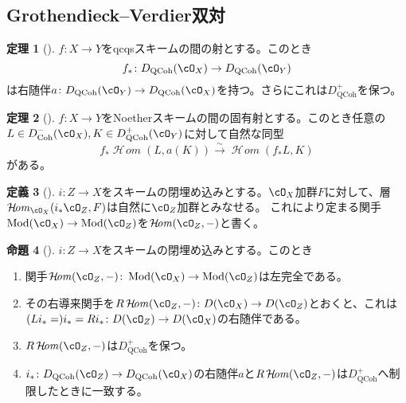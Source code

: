 \documentclass[uplatex, a4paper, dvipdfmx]{jsarticle}
\theoremstyle{definition}
\newtheorem{theorem}{定理}[section]
\newtheorem{definition}[theorem]{定義}
\newtheorem{proposition}[theorem]{命題}
\DeclareMathOperator{\CHom}{\mathcal{H}\!\mathit{om}}
\DeclareMathOperator{\Coh}{\mathrm{Coh}}
\DeclareMathOperator{\QCoh}{\mathrm{QCoh}}
\DeclareMathOperator{\Mod}{\mathrm{Mod}}
\begin{document}
\subsection{Grothendieck--Verdier双対}
\begin{theorem}[{\cite[\href{https://stacks.math.columbia.edu/tag/0A9E}{Tag 0A9E}]{stacks-project}}]
    $f \colon X \to Y$をqcqsスキームの間の射とする。このとき
    \begin{equation}
        f_* \colon D_{\QCoh}(\cO_X) \to D_{\QCoh}(\cO_Y)
    \end{equation}
    は右随伴$a \colon D_{\QCoh}(\cO_Y) \to D_{\QCoh}(\cO_X)$を持つ。さらにこれは$D_{\QCoh}^+$を保つ。
\end{theorem}
\begin{theorem}[{\cite[\href{https://stacks.math.columbia.edu/tag/0GEW}{Tag 0GEW}]{stacks-project}}]\label{thm:Grothendieck-Verdier-duality-for-complexes}
    $f \colon X \to Y$をNoetherスキームの間の固有射とする。このとき任意の$L \in D_{\Coh}^-(\cO_X), K \in D_{\QCoh}^+(\cO_Y)$に対して自然な同型
    \begin{equation}
        f_* \CHom(L, a(K)) \xrightarrow{\sim} \CHom(f_*L, K)
    \end{equation}
    がある。
\end{theorem}
\begin{definition}[{\cite[\href{https://stacks.math.columbia.edu/tag/0A74}{Tag 0A74}]{stacks-project}}]
    $i \colon Z \to X$をスキームの閉埋め込みとする。$\cO_X$加群$F$に対して、層$\CHom_{\cO_X}(i_*\cO_Z, F)$は自然に$\cO_Z$加群とみなせる。
    これにより定まる関手$\Mod(\cO_X) \to \Mod(\cO_Z)$を$\CHom(\cO_Z, -)$と書く。
\end{definition}
\begin{proposition}[{\cite[\href{https://stacks.math.columbia.edu/tag/0A74}{Tag 0A74}]{stacks-project}}]\label{prop:Grothendieck-Verdier-duality-for-closed-immersion}
    $i \colon Z \to X$をスキームの閉埋め込みとする。このとき
    \begin{enumerate}
        \item 関手$\CHom(\cO_Z, -) \colon \Mod(\cO_X) \to \Mod(\cO_Z)$は左完全である。
        \item その右導来関手を$R\CHom(\cO_Z, -) \colon D(\cO_X) \to D(\cO_Z)$とおくと、これは$(L i_* = )i_* = R i_* \colon D(\cO_Z) \to D(\cO_X)$の右随伴である。
        \item $R\CHom(\cO_Z, -)$は$D_{\QCoh}^+$を保つ。
        \item $i_* \colon D_{\QCoh}(\cO_Z) \to D_{\QCoh}(\cO_X)$の右随伴$a$と$R\CHom(\cO_Z, -)$は$D_{\QCoh}^+$へ制限したときに一致する。
    \end{enumerate}
\end{proposition}
\end{document}
